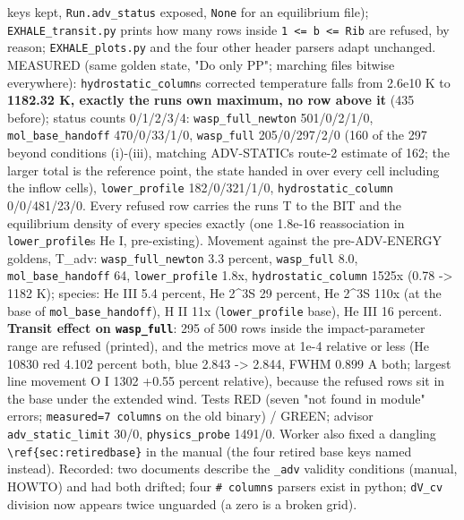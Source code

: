 \documentclass[english,a4paper]{my_memo}
\begin{document}
\begin{itemize}
  keys kept, \texttt{Run.adv\_status} exposed, \texttt{None} for an equilibrium file);
  \texttt{EXHALE\_transit.py} prints how many rows inside \texttt{1\ \textless{}=\ b\ \textless{}=\ Rib} are
  refused, by reason; \texttt{EXHALE\_plots.py} and the four other header parsers
  adapt unchanged. MEASURED (same golden state, "Do only PP"; marching
  files bitwise everywhere): \texttt{hydrostatic\_column}\textquotesingle s corrected temperature
  falls from 2.6e10 K to \textbf{1182.32 K, exactly the run\textquotesingle s own maximum, no row
  above it} (435 before); status counts 0/1/2/3/4: \texttt{wasp\_full\_newton}
  501/0/2/1/0, \texttt{mol\_base\_handoff} 470/0/33/1/0, \texttt{wasp\_full} 205/0/297/2/0
  (160 of the 297 beyond conditions (i)-(iii), matching ADV-STATIC\textquotesingle s
  route-2 estimate of 162; the larger total is the reference point, the
  state handed in over every cell including the inflow cells), \texttt{lower\_profile}
  182/0/321/1/0, \texttt{hydrostatic\_column} 0/0/481/23/0. Every refused row
  carries the run\textquotesingle s T to the BIT and the equilibrium density of every
  species exactly (one 1.8e-16 reassociation in \texttt{lower\_profile}\textquotesingle s He I,
  pre-existing). Movement against the pre-ADV-ENERGY goldens, T\_adv:
  \texttt{wasp\_full\_newton} 3.3 percent, \texttt{wasp\_full} 8.0, \texttt{mol\_base\_handoff} 64,
  \texttt{lower\_profile} 1.8x, \texttt{hydrostatic\_column} 1525x (0.78 -\textgreater{} 1182 K);
  species: He III 5.4 percent, He 2\^{}3S 29 percent, He 2\^{}3S 110x (at the
  base of \texttt{mol\_base\_handoff}), H II 11x (\texttt{lower\_profile} base), He III 16
  percent. \textbf{Transit effect on \texttt{wasp\_full}}: 295 of 500 rows inside the
  impact-parameter range are refused (printed), and the metrics move at
  1e-4 relative or less (He 10830 red 4.102 percent both, blue 2.843 -\textgreater{}
  2.844, FWHM 0.899 A both; largest line movement O I 1302 +0.55 percent
  relative), because the refused rows sit in the base under the extended
  wind. Tests RED (seven "not found in module" errors; \texttt{measured=7\ columns} on the old binary) / GREEN; advisor \texttt{adv\_static\_limit} 30/0,
  \texttt{physics\_probe} 1491/0. Worker also fixed a dangling \texttt{\textbackslash{}ref\{sec:retiredbase\}}
  in the manual (the four retired base keys named instead). Recorded: two
  documents describe the \texttt{\_adv} validity conditions (manual, HOWTO) and had
  both drifted; four \texttt{\#\ columns} parsers exist in python; \texttt{dV\_cv} division
  now appears twice unguarded (a zero is a broken grid).

\end{itemize}
\end{document}
